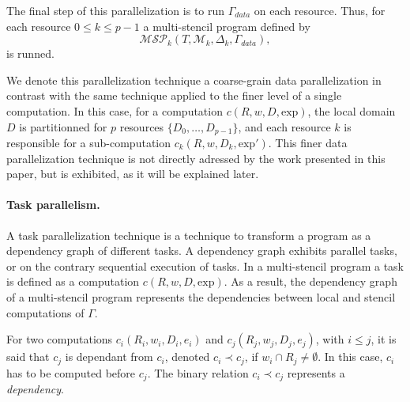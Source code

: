  The final step of this parallelization is to run $\Gamma_{data}$ on each resource. Thus, for each resource $0 \leq k \leq p-1$ a multi-stencil program defined by
\begin{equation}
\mathcal{MSP}_k(T,\mathcal{M}_k,\Delta_k,\Gamma_{data}),
\end{equation}
is runned.

We denote this parallelization technique a coarse-grain data parallelization in contrast with the same technique applied to the finer level of a single computation. In this case, for a computation $c(R,w,D,\text{exp})$, the local domain $D$ is partitionned for $p$ resources $\{D_0,\dots,D_{p-1}\}$, and each resource $k$ is responsible for a sub-computation $c_k(R,w,D_k,\text{exp}')$.
This finer data parallelization technique is not directly adressed by the work presented in this paper, but is exhibited, as it will be explained later. 

\paragraph{Task parallelism.}
A task parallelization technique is a technique to transform a program as a dependency graph of different tasks. A dependency graph exhibits parallel tasks, or on the contrary sequential execution of tasks. In a multi-stencil program a task is defined as a computation $c(R,w,D,\text{exp})$. As a result, the dependency graph of a multi-stencil program represents the dependencies between local and stencil computations of $\Gamma$.

\begin{mydef}
For two computations $c_i(R_i,w_i,D_i,e_i)$ and $c_j(R_j,w_j,D_j,e_j)$, with $i \leq j$, it is said that $c_j$ is dependant from $c_i$, denoted $c_i\prec c_j$, if $w_i \cap R_j \neq \emptyset$. In this case, $c_i$ has to be computed before $c_j$. The binary relation $c_i\prec c_j$ represents a \textit{dependency}.
\end{mydef}

